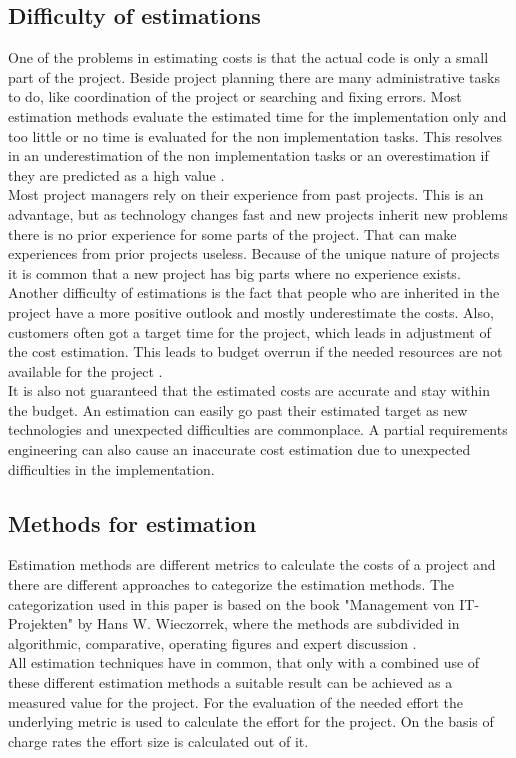 \subsection{Difficulty of estimations}

One of the problems in estimating costs is that the actual code is only a small part of the project. Beside project planning there are many administrative tasks to do, like coordination of the project or searching and fixing errors. Most estimation methods evaluate the estimated time for the implementation only and too little or no time is evaluated for the non implementation tasks. This resolves in an underestimation of the non implementation tasks or an overestimation if they are predicted as a high value \cite{itplanung}.
\\
Most project managers rely on their experience from past projects. This is an advantage, but as technology changes fast and new projects inherit new problems there is no prior experience for some parts of the project. That can make experiences from prior projects useless. Because of the unique nature of projects it is common that a new project has big parts where no experience exists. Another difficulty of estimations is the fact that people who are inherited in the project have a more positive outlook and mostly underestimate the costs.
Also, customers often got a target time for the project, which leads in adjustment of the cost estimation. This leads to budget overrun if the needed resources are not available for the project \cite{winfwiki}.
\\
It is also not guaranteed that the estimated costs are accurate and stay within the budget. An estimation can easily go past their estimated target as new technologies and unexpected difficulties are commonplace. A partial requirements engineering can also cause an inaccurate cost estimation due to unexpected difficulties in the implementation.\\

\subsection{Methods for estimation}\label{chapter:estimationmethods}

Estimation methods are different metrics to calculate the costs of a project and there are different approaches to categorize the estimation methods. The categorization used in this paper is based on the book "Management von IT-Projekten" by Hans W. Wieczorrek, where the methods are subdivided in algorithmic, comparative, operating figures and expert discussion \cite{itplanung}.\\
All estimation techniques have in common, that only with a combined use of these different estimation methods a suitable result can be achieved as a measured value for the project. For the evaluation of the needed effort the underlying metric is used to calculate the effort for the project. On the basis of charge rates the effort size is calculated out of it.\\

